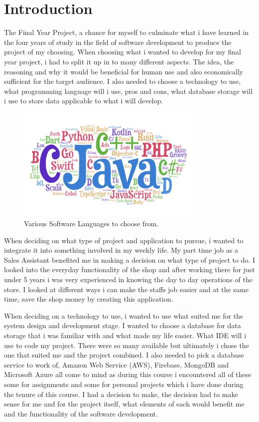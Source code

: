 \chapter{Introduction}
The Final Year Project, a chance for myself to culminate what i have learned in the four years of study in the field of software development to produce the project of my choosing. When choosing what i wanted to develop for my final year project, i had to split it up in to many different aspects. The idea, the reasoning and why it would be beneficial for human use and also economically sufficient for the target audience. I also needed to choose a technology to use, what programming language will i use, pros and cons, what database storage will i use to store data applicable to what i will develop.  

\begin{figure}[h!]
	\caption{Various Software Languages to choose from.}
	\label{image:progLanguages}
	\centering
	\includegraphics[width=0.8\textwidth]{images/progLanguages.png}
\end{figure}	

\newpage

When deciding on what type of project and application to pursue, i wanted to integrate it into something involved in my weekly life. My part time job as a Sales Assistant benefited me in making a decision on what type of project to do. I looked into the everyday functionality of the shop and after working there for just under 5 years i was very experienced in knowing the day to day operations of the store. I looked at different ways i can make the staffs job easier and at the same time, save the shop money by creating this application. 
\newline

When deciding on a technology to use, i wanted to use what suited me for the system design and development stage. I wanted to choose a database for data storage that i was familiar with and what made my life easier. What IDE will i use to code my project. There were so many available but ultimately i chose the one that suited me and the project combined. I also needed to pick a database service to work of, Amazon Web Service (AWS), Firebase, MongoDB and Microsoft Azure all come to mind as during this course i encountered all of these some for assignments and some for personal projects which i have done during the tenure of this course. I had a decision to make, the decision had to make sense for me and for the project itself, what elements of each would benefit me and the functionality of the software development.
\newline

